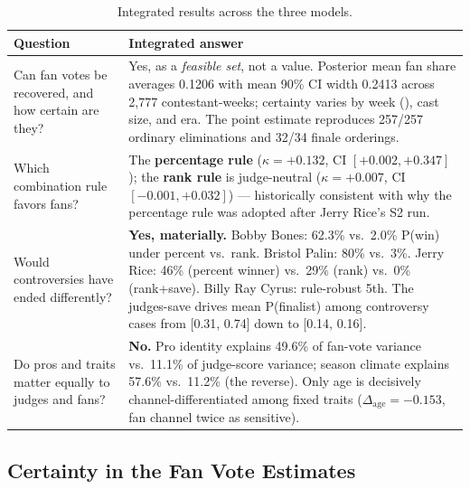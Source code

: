 \documentclass{article}
\begin{document}
\begin{table}[H]
\centering
\caption{Integrated results across the three models.}
\label{tab:integrated}
\begin{tabular}{p{5cm}p{9.5cm}}
\toprule
Question & Integrated answer \\
\midrule
Can fan votes be recovered, and how certain are they?
& Yes, as a \emph{feasible set}, not a value. Posterior mean fan share averages 0.1206 with mean 90\% CI width 0.2413 across 2{,}777 contestant-weeks; certainty varies by week (), cast size, and era. The point estimate reproduces 257/257 ordinary eliminations and 32/34 finale orderings. \\[4pt]
Which combination rule favors fans?
& The \textbf{percentage rule} ($\kappa = +0.132$, CI $[+0.002, +0.347]$); the \textbf{rank rule} is judge-neutral ($\kappa = +0.007$, CI $[-0.001, +0.032]$) --- historically consistent with why the percentage rule was adopted after Jerry Rice's S2 run. \\[4pt]
Would controversies have ended differently?
& \textbf{Yes, materially.} Bobby Bones: 62.3\% vs.\ 2.0\% P(win) under percent vs.\ rank. Bristol Palin: 80\% vs.\ 3\%. Jerry Rice: 46\% (percent winner) vs.\ 29\% (rank) vs.\ 0\% (rank+save). Billy Ray Cyrus: rule-robust 5th. The judges-save drives mean P(finalist) among controversy cases from [0.31, 0.74] down to [0.14, 0.16]. \\[4pt]
Do pros and traits matter equally to judges and fans?
& \textbf{No.} Pro identity explains 49.6\% of fan-vote variance vs.\ 11.1\% of judge-score variance; season climate explains 57.6\% vs.\ 11.2\% (the reverse). Only age is decisively channel-differentiated among fixed traits ($\Delta_{\text{age}} = -0.153$, fan channel twice as sensitive). \\
\bottomrule
\end{tabular}
\end{table}

\subsection{Certainty in the Fan Vote Estimates}
\end{document}
